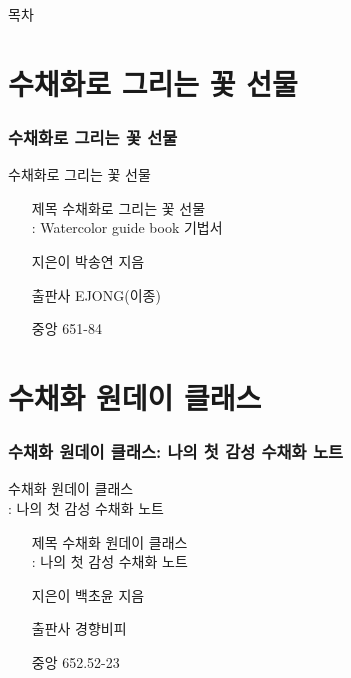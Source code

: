 \documentclass[aspectratio=1610,17pt,xcolor=pdftex,dvipsnames,table,handout]{beamer}
\begin{document}
		\begin{frame} [plain]{목차}
		\tableofcontents%
		\end{frame}




	
	


		\section{수채화로 그리는 꽃 선물 }
		\begin{frame} [t,plain]
		\frametitle{수채화로 그리는 꽃 선물 }
			\begin{block} {수채화로 그리는 꽃 선물 }
			\setlength{\leftmargini}{4em}			
			\begin{itemize}
				\item [제목] 수채화로 그리는 꽃 선물 \\: Watercolor guide book 기법서	
				\item [지은이] 박송연 지음	
				\item [출판사] EJONG(이종)	
				\item [중앙] 651-84 		
			\end{itemize}
			\end{block}						
								
		\end{frame}						

	
		\section{수채화 원데이 클래스}
		\begin{frame} [t,plain]
		\frametitle{수채화 원데이 클래스: 나의 첫 감성 수채화 노트} 	
			\begin{block} {수채화 원데이 클래스\\: 나의 첫 감성 수채화 노트} 	
			\setlength{\leftmargini}{4em}			
			\begin{itemize}
				\item [제목] 수채화 원데이 클래스\\: 나의 첫 감성 수채화 노트
				\item [지은이] 백초윤 지음	
				\item [출판사] 경향비피	
				\item [중앙] 652.52-23		
			\end{itemize}
			\end{block}						
								
		\end{frame}						
\end{document}
